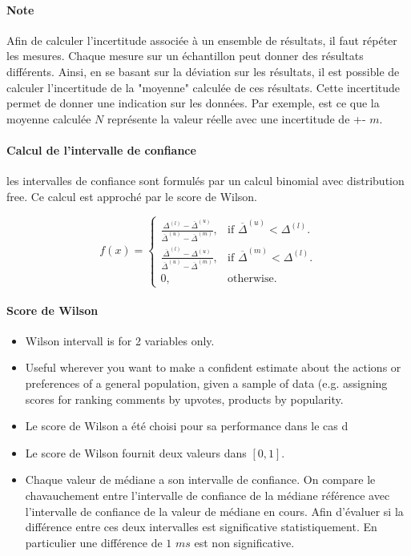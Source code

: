 \documentclass[]{report}
\begin{document}
\paragraph{Note}
Afin de calculer l'incertitude associée à un ensemble de résultats, il faut répéter les mesures. Chaque mesure sur un échantillon peut donner des résultats différents. Ainsi, en se basant sur la déviation sur les résultats, il est possible de calculer l'incertitude de la "moyenne" calculée de ces résultats. Cette incertitude permet de donner une indication sur les données. Par exemple, est ce que la moyenne calculée $N$ représente la valeur réelle avec une incertitude de +- $m$.

\paragraph{Calcul de l'intervalle de confiance}
les intervalles de confiance sont formulés par un calcul binomial avec distribution free. Ce calcul  est approché par le score de Wilson.


\begin{equation}
f(x)=\begin{cases}
\frac{\Delta^{(l)} - \overline{\Delta}^{(u)}}{\overline{\Delta}^{(u)} - \overline{\Delta}^{(m)}}    , & \text{if $\overline{\Delta}^{(u)}<\Delta^{(l)}$}.\\

\frac{\overline{\Delta}^{(l)} - \Delta^{(u)}}{\overline{\Delta}^{(u)} - \overline{\Delta}^{(m)}}, & \text{if $\overline{\Delta}^{(m)}<\Delta^{(l)}$}.\\
0, & \text{otherwise}.
\end{cases}
\end{equation}
\paragraph{Score de Wilson}
\begin{itemize}
	\item Wilson intervall is for 2 variables only.
	\item  Useful wherever you want to make a confident estimate about the actions or preferences of a general population, given a sample of data (e.g. assigning scores for ranking comments by upvotes, products by popularity.
	\item Le score de Wilson a été choisi pour sa performance dans le cas d
	\item Le score de Wilson fournit deux valeurs dans $ [0, 1]$. 
	\item Chaque valeur de médiane a son intervalle de confiance. On compare le chavauchement entre l'intervalle de confiance de la médiane référence avec l'intervalle de confiance de la valeur de médiane en cours. Afin d'évaluer si la différence entre ces deux intervalles est significative statistiquement. En particulier une différence de $1$ $ms$ est non significative.
\end{itemize}
\end{document}
